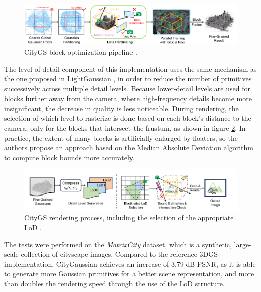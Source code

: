 \begin{figure}[H]
    \centering
    \includegraphics[width=0.8\linewidth]{figures/citygs_training.png}
    \caption{CityGS block optimization pipeline \cite{liu2024citygaussian}.}
    \label{fig:city_training}
\end{figure}

The level-of-detail component of this implementation uses the same mechanism as the one proposed in LightGaussian \cite{fan2023lightgaussian}, in order to reduce the number of primitives successively across multiple detail levels. Because lower-detail levels are used for blocks further away from the camera, where high-frequency details become more insignificant, the decrease in quality is less noticeable. During rendering, the selection of which level to rasterize is done based on each block's distance to the camera, only for the blocks that intersect the frustum, as shown in figure \ref{fig:city_render}. In practice, the extent of many blocks is artificially enlarged by floaters, so the authors propose an approach based on the Median Absolute Deviation algorithm \cite{dodge2008concise} to compute block bounds more accurately.

\begin{figure}[H]
    \centering
    \includegraphics[width=0.8\linewidth]{figures/citygs_rendering.png}
    \caption{CityGS rendering process, including the selection of the appropriate LoD \cite{liu2024citygaussian}.}
    \label{fig:city_render}
\end{figure}

The tests were performed on the \textit{MatrixCity} \cite{li2023matrixcity} dataset, which is a synthetic, large-scale collection of cityscape images. Compared to the reference 3DGS implementation, CityGaussian achieves an increase of 3.79 dB PSNR, as it is able to generate more Gaussian primitives for a better scene representation, and more than doubles the rendering speed through the use of the LoD structure. 

